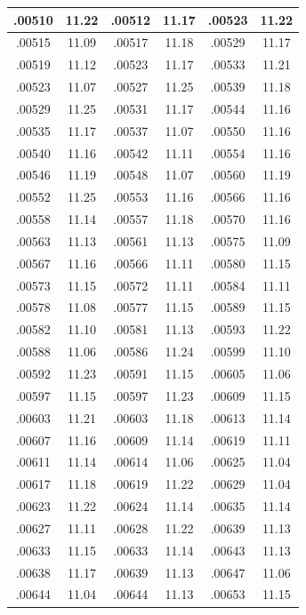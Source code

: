 \documentclass[10pt,twoside]{report}
\begin{document}
\begin{appendices}
\begin{longtable}{|c|c||c|c||c|c|}
.00510 & 11.22 & .00512 & 11.17 & .00523 & 11.22\\\hline
.00515 & 11.09 & .00517 & 11.18 & .00529 & 11.17\\\hline
.00519 & 11.12 & .00523 & 11.17 & .00533 & 11.21\\\hline
.00523 & 11.07 & .00527 & 11.25 & .00539 & 11.18\\\hline
.00529 & 11.25 & .00531 & 11.17 & .00544 & 11.16\\\hline
.00535 & 11.17 & .00537 & 11.07 & .00550 & 11.16\\\hline
.00540 & 11.16 & .00542 & 11.11 & .00554 & 11.16\\\hline
.00546 & 11.19 & .00548 & 11.07 & .00560 & 11.19\\\hline
.00552 & 11.25 & .00553 & 11.16 & .00566 & 11.16\\\hline
.00558 & 11.14 & .00557 & 11.18 & .00570 & 11.16\\\hline
.00563 & 11.13 & .00561 & 11.13 & .00575 & 11.09\\\hline
.00567 & 11.16 & .00566 & 11.11 & .00580 & 11.15\\\hline
.00573 & 11.15 & .00572 & 11.11 & .00584 & 11.11\\\hline
.00578 & 11.08 & .00577 & 11.15 & .00589 & 11.15\\\hline
.00582 & 11.10 & .00581 & 11.13 & .00593 & 11.22\\\hline
.00588 & 11.06 & .00586 & 11.24 & .00599 & 11.10\\\hline
.00592 & 11.23 & .00591 & 11.15 & .00605 & 11.06\\\hline
.00597 & 11.15 & .00597 & 11.23 & .00609 & 11.15\\\hline
.00603 & 11.21 & .00603 & 11.18 & .00613 & 11.14\\\hline
.00607 & 11.16 & .00609 & 11.14 & .00619 & 11.11\\\hline
.00611 & 11.14 & .00614 & 11.06 & .00625 & 11.04\\\hline
.00617 & 11.18 & .00619 & 11.22 & .00629 & 11.04\\\hline
.00623 & 11.22 & .00624 & 11.14 & .00635 & 11.14\\\hline
.00627 & 11.11 & .00628 & 11.22 & .00639 & 11.13\\\hline
.00633 & 11.15 & .00633 & 11.14 & .00643 & 11.13\\\hline
.00638 & 11.17 & .00639 & 11.13 & .00647 & 11.06\\\hline
.00644 & 11.04 & .00644 & 11.13 & .00653 & 11.15\\\hline

\end{longtable}
\end{appendices}
\end{document}
